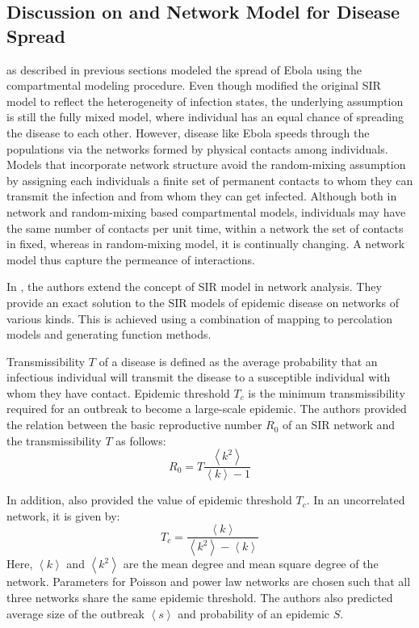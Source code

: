 \documentclass[10pt, journal,onecolumn]{IEEEtran}
\begin{document}
\subsection{\textbf{Discussion on \citep{chowell2004basic, legrand2007understanding} and Network Model for Disease Spread \citep{newman2002spread}}}
\citep{chowell2004basic, legrand2007understanding} as described in previous sections modeled the spread of Ebola using the compartmental modeling procedure. Even though \citep{legrand2007understanding} modified the original SIR model to reflect the heterogeneity of infection states, the underlying assumption is still the fully mixed model, where individual has an equal chance of spreading the disease to each other. However, disease like Ebola speeds through the populations via the networks formed by physical contacts among individuals. Models that incorporate network structure avoid the random-mixing assumption by assigning each individuals a finite set of permanent contacts to whom they can transmit the infection and from whom they can get infected. Although both in network and random-mixing based compartmental models, individuals may have the same number of contacts per unit time, within a network the set of contacts in fixed, whereas in random-mixing model, it is continually changing. A network model thus capture the permeance of interactions.

\bigskip 
In \citep{newman2002spread}, the authors extend the concept of SIR model in network analysis.
They provide an exact solution to the SIR models of epidemic disease on networks of various kinds.
This is achieved using a combination of mapping to percolation models and generating function methods.

Transmissibility $T$ of a disease is defined as the average probability that an infectious
individual will transmit the disease to a susceptible individual with whom they have contact.
Epidemic threshold $T_c$ is the minimum transmissibility required for an outbreak to become
a large-scale epidemic. The authors provided the relation between the basic reproductive number
$R_0$ of an SIR network and the transmissibility $T$ as follows:
\[
R_0 = T  \dfrac{\left\langle k^2 \right\rangle}{\left\langle k \right\rangle-1}
\]

In addition, \citep{newman2002spread} also provided the value of epidemic threshold $T_c$.  In an uncorrelated network, it is given by:
\[
T_c =\dfrac{\left\langle k \right\rangle}{\left\langle k^2 \right\rangle - \left\langle k \right\rangle}
\]
Here, $\left\langle k \right\rangle$ and $\left\langle k^2 \right\rangle$ are the mean degree and mean square degree of the network. Parameters for Poisson and power law networks are chosen such that all three networks share the same epidemic threshold. The authors also predicted average size of the outbreak $\left\langle s \right\rangle$ and probability of an epidemic $S$. 
\end{document}
